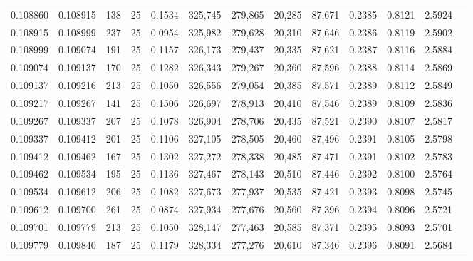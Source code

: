\begin{tabular}{rrrrrrrrrrrrr}
0.108860 & 0.108915 &   138 &  25 &                                     0.1534 & 325,745 & 279,865 &  20,285 &  87,671 & 0.2385 & 0.8121 & 2.5924 \\
0.108915 & 0.108999 &   237 &  25 &                                     0.0954 & 325,982 & 279,628 &  20,310 &  87,646 & 0.2386 & 0.8119 & 2.5902 \\
0.108999 & 0.109074 &   191 &  25 &                                     0.1157 & 326,173 & 279,437 &  20,335 &  87,621 & 0.2387 & 0.8116 & 2.5884 \\
0.109074 & 0.109137 &   170 &  25 &                                     0.1282 & 326,343 & 279,267 &  20,360 &  87,596 & 0.2388 & 0.8114 & 2.5869 \\
0.109137 & 0.109216 &   213 &  25 &                                     0.1050 & 326,556 & 279,054 &  20,385 &  87,571 & 0.2389 & 0.8112 & 2.5849 \\
0.109217 & 0.109267 &   141 &  25 &                                     0.1506 & 326,697 & 278,913 &  20,410 &  87,546 & 0.2389 & 0.8109 & 2.5836 \\
0.109267 & 0.109337 &   207 &  25 &                                     0.1078 & 326,904 & 278,706 &  20,435 &  87,521 & 0.2390 & 0.8107 & 2.5817 \\
0.109337 & 0.109412 &   201 &  25 &                                     0.1106 & 327,105 & 278,505 &  20,460 &  87,496 & 0.2391 & 0.8105 & 2.5798 \\
0.109412 & 0.109462 &   167 &  25 &                                     0.1302 & 327,272 & 278,338 &  20,485 &  87,471 & 0.2391 & 0.8102 & 2.5783 \\
0.109462 & 0.109534 &   195 &  25 &                                     0.1136 & 327,467 & 278,143 &  20,510 &  87,446 & 0.2392 & 0.8100 & 2.5764 \\
0.109534 & 0.109612 &   206 &  25 &                                     0.1082 & 327,673 & 277,937 &  20,535 &  87,421 & 0.2393 & 0.8098 & 2.5745 \\
0.109612 & 0.109700 &   261 &  25 &                                     0.0874 & 327,934 & 277,676 &  20,560 &  87,396 & 0.2394 & 0.8096 & 2.5721 \\
0.109701 & 0.109779 &   213 &  25 &                                     0.1050 & 328,147 & 277,463 &  20,585 &  87,371 & 0.2395 & 0.8093 & 2.5701 \\
0.109779 & 0.109840 &   187 &  25 &                                     0.1179 & 328,334 & 277,276 &  20,610 &  87,346 & 0.2396 & 0.8091 & 2.5684 \\

\end{tabular}
